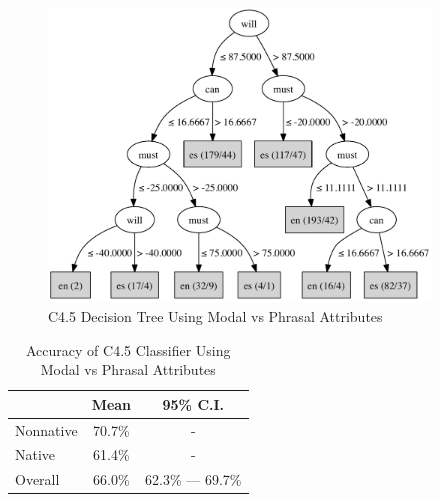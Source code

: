 \documentclass[main.tex]{subfiles}
\begin{document}
\begin{figure}[htbp]
\centering
\includegraphics[width=4in]{modal-phrasal-tree.pdf}
\caption{C4.5 Decision Tree Using Modal vs Phrasal Attributes}
\label{fig:modal-phrasal-tree}
\end{figure}
\begin{table}[htbp]
\centering
\caption{Accuracy of C4.5 Classifier Using Modal vs Phrasal Attributes}
\begin{tabular}{l c c}
\toprule
& Mean & 95\% C.I.\\
\midrule
Nonnative & 70.7\% & - \\
[6pt]Native & 61.4\% & - \\
[6pt]Overall & 66.0\% & 62.3\% --- 69.7\% \\
\bottomrule
\end{tabular}
\label{table:modal-phrasal-results}
\end{table}
\end{document}
